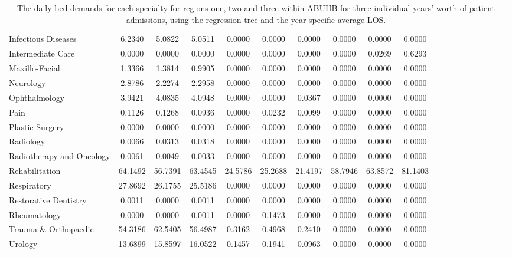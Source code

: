 \documentclass[thesis.tex]{subfiles}
\begin{document}
\begin{landscape}
\begin{table}[h!]
{\begin{tabular}{lcccccccccccccccccc}
Infectious Diseases	&6.2340&	5.0822&	5.0511&	0.0000&	0.0000&	0.0000&	0.0000&	0.0000&	0.0000\\
Intermediate Care	&0.0000&	0.0000&	0.0000&	0.0000&	0.0000&	0.0000&	0.0000&	0.0269&	0.6293\\
Maxillo-Facial&	1.3366&	1.3814&	0.9905&	0.0000&	0.0000&	0.0000&	0.0000&	0.0000&	0.0000\\
Neurology	&2.8786&	2.2274&	2.2958&	0.0000&	0.0000&	0.0000&	0.0000&	0.0000&	0.0000\\
Ophthalmology	&3.9421&	4.0835&	4.0948&	0.0000&	0.0000&	0.0367&	0.0000&	0.0000&	0.0000\\
Pain	&0.1126&	0.1268&	0.0936&	0.0000&	0.0232&	0.0099&	0.0000&	0.0000&	0.0000\\
Plastic Surgery	&0.0000&	0.0000&	0.0000&	0.0000&	0.0000&	0.0000&	0.0000&	0.0000&	0.0000\\
Radiology	&0.0066&	0.0313&	0.0318&	0.0000&	0.0000&	0.0000&	0.0000&	0.0000&	0.0000\\
Radiotherapy and Oncology&	0.0061&	0.0049&	0.0033&	0.0000&	0.0000&	0.0000&	0.0000&	0.0000&	0.0000\\
Rehabilitation	&64.1492&	56.7391&	63.4545&	24.5786&	25.2688&	21.4197&	58.7946&	63.8572&	81.1403\\
Respiratory	&27.8692&	26.1755&	25.5186&	0.0000&	0.0000&	0.0000&	0.0000&	0.0000&	0.0000\\
Restorative Dentistry	&0.0011&	0.0000&	0.0011&	0.0000&	0.0000&	0.0000&	0.0000&	0.0000&	0.0000\\
Rheumatology	&0.0000&	0.0000&	0.0011&	0.0000&	0.1473&	0.0000&	0.0000&	0.0000&	0.0000\\
Trauma \& Orthopaedic&	54.3186&	62.5405&	56.4987&	0.3162&	0.4968&	0.2410&	0.0000&	0.0000&	0.0000\\
Urology	&13.6899&	15.8597&	16.0522&	0.1457&	0.1941&	0.0963&	0.0000&	0.0000&	0.0000\\

\bottomrule
\end{tabular}  } 
\caption{The daily bed demands for each specialty for regions one, two and three within ABUHB for three individual years’ worth of patient admissions, using the regression tree and the year specific average LOS.}
    \label{apptab:LinkedDemands3a}
\end{table}


\end{landscape}
\end{document}

